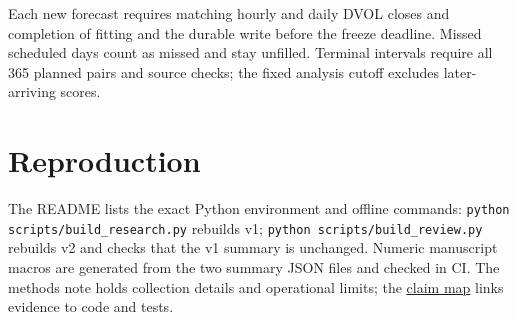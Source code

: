 \documentclass[10pt,a4paper]{article}
\newcommand{\PlannedOrigins}{365}
\begin{document}
Each new forecast requires matching hourly and daily DVOL closes and completion of fitting and the durable write before the freeze deadline. Missed scheduled days count as missed and stay unfilled. Terminal intervals require all \PlannedOrigins{} planned pairs and source checks; the fixed analysis cutoff excludes later-arriving scores.

\appendix
\section{Reproduction}

The README lists the exact Python environment and offline commands: \texttt{python scripts/build\_research.py} rebuilds v1; \texttt{python scripts/build\_review.py} rebuilds v2 and checks that the v1 summary is unchanged. Numeric manuscript macros are generated from the two summary JSON files and checked in CI. The methods note holds collection details and operational limits; the \href{https://github.com/50kfunded/implied-odds/blob/main/report/claim-map.md}{claim map} links evidence to code and tests.

\begingroup\raggedright
\nocite{politisromano,deribit}


\endgroup
\end{document}
